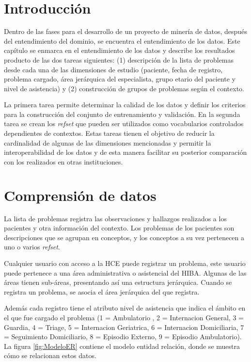 \section{Introducción}
Dentro de las fases para el desarrollo de un proyecto de minería de datos, después del entendimiento del dominio, se encuentra el entendimiento de los datos. Este capítulo se enmarca en el entendimiento de los datos y describe los resultados producto de las dos tareas siguientes: (1) descripción de la lista de problemas desde cada una de las dimensiones de estudio (paciente, fecha de registro, problema cargado, área jerárquica del especialista, grupo etario del paciente y nivel de asistencia) y (2) construcción de grupos de problemas según el contexto. 

La primera tarea permite determinar la calidad de los datos y definir los criterios para la construcción del conjunto de entrenamiento y validación. En la segunda tarea se crean los \textit{\acrshort{refset}} que pueden ser utilizados como vocabularios controlados dependientes de contextos. Estas tareas  tienen el objetivo de reducir la cardinalidad de algunas de las dimensiones mencionadas y permitir la interoperabilidad de los datos y de esta manera facilitar su posterior comparación con los realizados en otras instituciones.

\section{Comprensión de datos}
La lista de problemas registra las observaciones y hallazgos realizados a los pacientes y otra información del contexto. Los problemas de los pacientes son descripciones que se agrupan en conceptos, y los conceptos a su vez pertenecen a uno o varios \textit{\acrshort{refset}}.

Cualquier usuario con acceso a la \acrshort{HCE} puede registrar un problema, este usuario puede pertenece a una área administrativa o asistencial del \acrshort{HIBA}. Algunas de las áreas tienen sub-áreas, presentando así una estructura jerárquica. Cuando se registra un problema, se asocia el área jerárquica del que registra.

Además cada registro tiene el atributo nivel de asistencia que indica el ámbito en el que fue cargado el problema (1 = Ambulatorio , 2 = Internacion General, 3 = Guardia, 4 = Triage, 5 = Internacion Geriatrica, 6 = Internacion Domiciliaria, 7 = Seguimiento Domiciliario, 8 = Episodio Externo, 9 = Episodio Ambulatorio). La figura \ref{fig:ModeloER} contiene el modelo entidad relación, donde se muestra cómo se relacionan estos datos.

